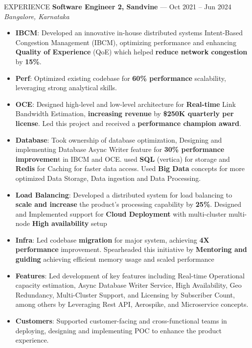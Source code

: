 \documentclass{resume} %
\begin{document}
\begin{rSection}{EXPERIENCE}
\textbf{Software Engineer 2, Sandvine} --- Oct 2021 -- Jun 2024\\
\textit{Bangalore, Karnataka}\\
 \begin{itemize}
    \itemsep -6pt 
     \item \textbf{IBCM}:  Developed an innovative in-house distributed systems Intent-Based Congestion Management (IBCM), optimizing performance and enhancing \textbf{Quality of Experience} (QoE) which helped \textbf{reduce network congestion} by\textbf{ 15\%}.
    \item \textbf{Perf}: Optimized existing codebase for \textbf{60\% performance} scalability, leveraging strong analytical skills.
    \item \textbf{OCE}: Designed high-level and low-level architecture for \textbf{Real-time} Link Bandwidth Estimation, \textbf{increasing revenue} by \textbf{\$250K quarterly per license}. Led this project and received a \textbf{performance champion award}. 
    \item \textbf{Database}: Took ownership of database optimization, Designing and implementing Database Async Writer feature for \textbf{30\% performance improvemen}t in IBCM and OCE. used \textbf{SQL} (vertica) for storage and \textbf{Redis} for Caching for faster data access. Used \textbf{Big Data} concepts for more optimized Data Storage, Data ingestion and Data Processing. 
    \item \textbf{Load Balancing}: Developed a distributed system for load balancing to \textbf{scale and increase} the product's processing capability by\textbf{ 25\%}. Designed and Implemented support for \textbf{Cloud Deployment}  with multi-cluster multi-node \textbf{High availability} setup
    \item \textbf{Infra}: Led codebase \textbf{migration} for major system, achieving \textbf{4X performance} improvement. Spearheaded this initiative by \textbf{Mentoring and guiding} achieving efficient memory usage and scaled performance
    \item \textbf{Features}: Led development of key features including Real-time Operational capacity  estimation, Async Database Writer Service,  High Availability, Geo Redundancy, Multi-Cluster Support, and Licensing by Subscriber Count, among others by Leveraging Rest API, Aerospike, and Microservice concepts. 
    \item \textbf{Customers}: Supported customer-facing and cross-functional teams in deploying, designing  and implementing POC  to enhance the product experience.


\end{itemize}
\end{rSection}
\end{document}
